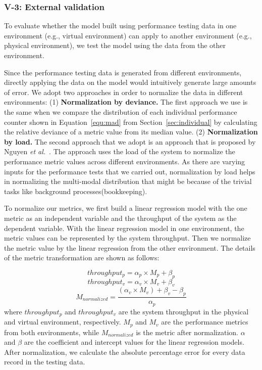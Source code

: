 \documentclass[smallextended]{svjour3}       %
\begin{document}
\subsubsection{V-3: External validation}
To evaluate whether the model built using performance testing data in one environment (e.g., virtual environment) can apply to another environment (e.g., physical environment), we test the model using the data from the other environment.

Since the performance testing data is generated from different environments, directly applying the data on the model would intuitively generate large amounts of error. We adopt two approaches in order to normalize the data in different environments: (1) \textbf{Normalization by deviance.} The first approach we use is the same when we compare the distribution of each individual performance counter shown in Equation~\ref{equ:mad} from Section~\ref{sec:individual} by calculating the relative deviance of a metric value from its median value. (2) \textbf{Normalization by load.} The second approach that we adopt is an approach that is proposed by Nguyen \textit{et al.}~\cite{Nguyen:2012:ADP:2188286.2188344}. The approach uses the load of the system to normalize the performance metric values across different environments. As there are varying inputs for the performance tests that we carried out, normalization by load helps in normalizing the multi-modal distribution that might be because of the trivial tasks like background processes(bookkeeping).



To normalize our metrics, we first build a linear regression model with the one metric as an independent variable and the throughput of the system as the dependent variable. With the linear regression model in one environment, the metric values can be represented by the system throughput. Then we normalize the metric value by the linear regression from the other environment. The details of the metric transformation are shown as follows:

\begin{equation*}
throughput_{p}= \alpha_{p} \times M_{p} + \beta_{p}
\end{equation*}
\vspace{-0.4cm}
\begin{equation*}
throughput_{v}= \alpha_{v} \times M_{v} + \beta_{v}
\end{equation*}
\vspace{-0.4cm}
\begin{equation*}
M_{normalized} = \frac{(\alpha_{v} \times M_{v})+\beta_{v}-\beta_{p}}{\alpha_{p}}
\end{equation*}
where $throughput_{p}$ and $throughput_{v}$ are the system throughput in the physical and virtual environment, respectively. $M_{p}$ and $M_{v}$ are the performance metrics from both environments, while $M_{normalized}$ is the metric after normalization. $\alpha$ and $\beta$ are the coefficient and intercept values for the linear regression models. After normalization, we calculate the absolute percentage error for every data record in the testing data.
\end{document}
